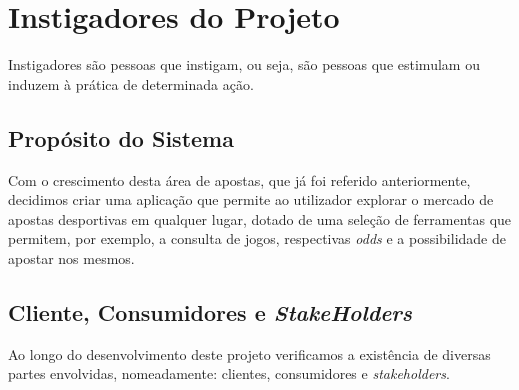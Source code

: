 \chapter{Instigadores do Projeto}
Instigadores são pessoas que instigam, ou seja, são pessoas que estimulam ou induzem à prática de determinada ação.
\section{Propósito do Sistema}

Com o crescimento desta área de apostas, que já foi referido anteriormente, decidimos criar uma aplicação que permite ao utilizador explorar o mercado de apostas desportivas em qualquer lugar, dotado de uma seleção de ferramentas que permitem, por exemplo, a consulta de jogos, respectivas \textit{odds} e a possibilidade de apostar nos mesmos. 

\section{Cliente, Consumidores e \textit{StakeHolders}}
Ao longo do desenvolvimento deste projeto verificamos a existência de diversas partes envolvidas, nomeadamente: clientes, consumidores e \textit{stakeholders}.

